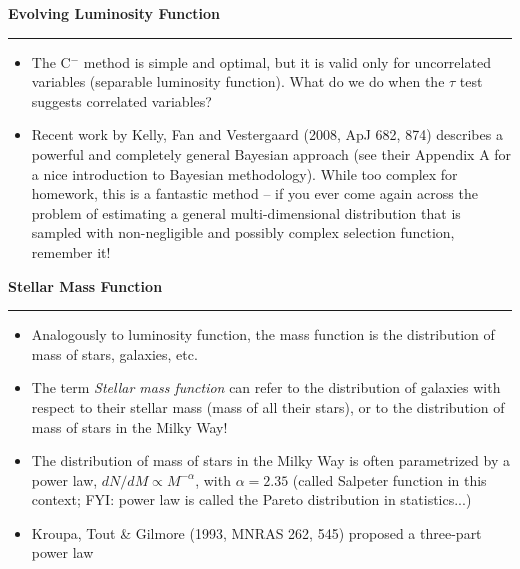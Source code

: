 \documentclass[letterpaper,landscape]{slides}
\begin{document}
 







\begin{slide}
\begin{center}
\bfseries
{\large {\color{red} Evolving Luminosity Function}}
\end{center}
\vskip 0.2in
\hrule

\begin{itemize}
\item The C$^-$ method is simple and optimal, but it is valid only 
      for uncorrelated variables (separable luminosity function). 
      What do we do when the $\tau$ test suggests correlated 
      variables? 
\item Recent work by Kelly, Fan and Vestergaard (2008, ApJ 682, 874)
      describes a powerful and completely general Bayesian approach
      (see their Appendix A for a nice introduction to Bayesian methodology). 
      While too complex for homework, this is a fantastic method -- if you ever
      come again across the problem of estimating a general multi-dimensional
      distribution that is sampled with non-negligible and possibly 
      complex selection function, remember it!
\end{itemize}

\vfill
\end{slide}
 

\begin{slide}
\begin{center}
\bfseries
{\large {\color{red} Stellar Mass Function}}
\end{center}
\vskip 0.2in
\hrule

\begin{itemize}
\item Analogously to luminosity function, the mass function is the distribution of mass of stars,
galaxies, etc. 
\item The term {\it Stellar mass function} can refer to the distribution of galaxies with respect
to their stellar mass (mass of all their stars), or to the distribution of mass of stars in the Milky Way! 
\item The distribution of mass of stars in the Milky Way is often parametrized by a power law, $dN/dM \propto M^{-\alpha}$,
with $\alpha=2.35$ (called Salpeter function in this context; FYI: power law is called the Pareto distribution in statistics...)
\item Kroupa, Tout \& Gilmore (1993, MNRAS 262, 545) proposed a three-part power law
\end{itemize}

\vfill
\end{slide}
 
\end{document}

